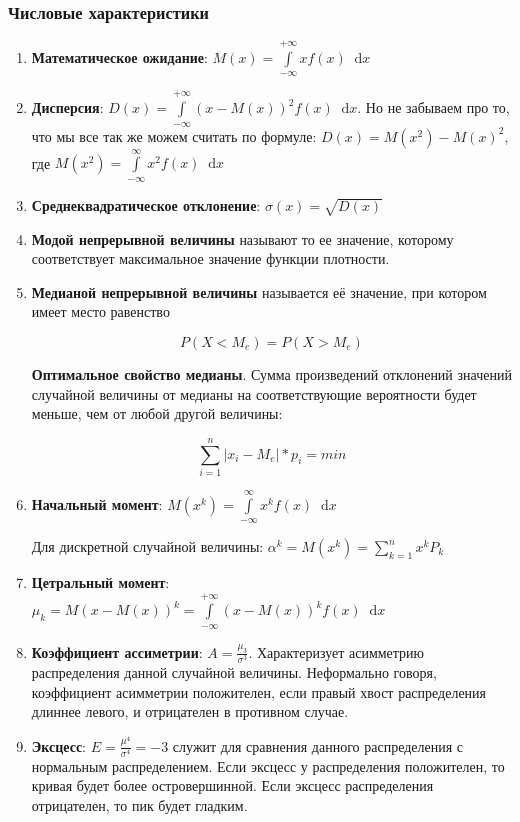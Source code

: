 \documentclass{article}
\newcommand*\diff{\mathop{}\!\mathrm{d}}
\begin{document}
\subsubsection{Числовые характеристики}

\begin{enumerate}
    \item \textbf{Математическое ожидание}: $M(x) = \int\limits_{-\infty}^{+\infty} x f(x) \diff x$
    \item \textbf{Дисперсия}: $D(x) = \int\limits_{-\infty}^{+\infty} (x - M(x))^2 f(x) \diff x$. Но не забываем про то, что мы все так же можем считать по формуле: $D(x) = M(x^2) - M(x)^2$, где $M(x^2) = \int\limits_{-\infty}^{\infty} x^2 f(x) \diff x$
    \item \textbf{Среднеквадратическое отклонение}: $\sigma(x) = \sqrt{D(x)}$
    \item \textbf{Модой непрерывной величины} называют то ее значение, которому соответствует максимальное значение функции плотности.
    \item \textbf{Медианой непрерывной величины} называется её значение, при котором имеет место равенство
    
    $$P(X < M_{e}) = P(X > M_{e})$$

    \textbf{Оптимальное свойство медианы}. Сумма произведений отклонений значений случайной величины от медианы на соответствующие вероятности будет меньше, чем от любой другой величины:

    $$\sum\limits_{i = 1}^{n} |x_{i} - M_{e}| * p_{i} = min$$
    \item \textbf{Начальный момент}: $M(x^{k}) = \int\limits_{-\infty}^{\infty} x^{k} f(x) \diff x$
    
    Для дискретной случайной величины: $\alpha^{k} = M(x^{k}) = \sum\limits_{k = 1}^{n} x^{k} P_{k}$
    \item \textbf{Цетральный момент}: $\mu_k = M(x - M(x))^{k} = \int\limits_{-\infty}^{+\infty} (x - M(x))^{k} f(x) \diff x$
    \item \textbf{Коэффициент ассиметрии}: $A = \frac{\mu_{3}}{\sigma^3}$. Характеризует асимметрию распределения данной случайной величины. Неформально говоря, коэффициент асимметрии положителен, если правый хвост распределения длиннее левого, и отрицателен в противном случае.
    \item \textbf{Эксцесс}: $E = \frac{\mu^4}{\sigma^4} = -3$ служит для сравнения данного распределения с нормальным распределением. Если эксцесс у распределения положителен, то кривая будет более островершинной. Если эксцесс распределения отрицателен, то пик будет гладким.
\end{enumerate}
\end{document}
